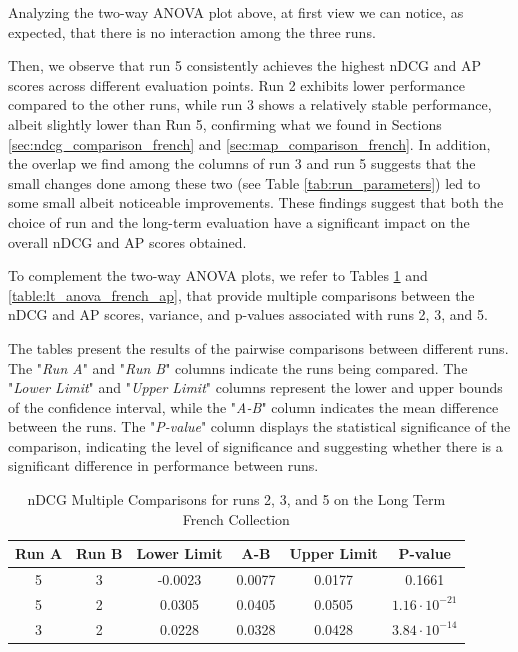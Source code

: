 Analyzing the two-way \ac{ANOVA} plot above, at first view we can notice, as expected, that there is no interaction among the three runs.  

Then, we observe that run 5 consistently achieves the highest \ac{nDCG}  and \ac{AP} scores across different evaluation points. 
Run 2 exhibits lower performance compared to the other runs, while run 3 shows a relatively stable performance, albeit slightly lower than Run 5, confirming what we found in Sections \ref{sec:ndcg_comparison_french} and \ref{sec:map_comparison_french}.
In addition, the overlap we find among the columns of run 3 and run 5 suggests that the small changes done among these two (see Table \ref{tab:run_parameters}) led to some small albeit noticeable improvements. 
These findings suggest that both the choice of run and the long-term evaluation have a significant impact on the overall \ac{nDCG} and \ac{AP} scores obtained.

To complement the two-way \ac{ANOVA} plots, we refer to Tables \ref{table:lt_anova_french} and \ref{table:lt_anova_french_ap}, that provide multiple comparisons between the \ac{nDCG} and \ac{AP} scores, variance, and p-values associated with runs 2, 3, and 5. 

The tables present the results of the pairwise comparisons between different runs. 
The "\textit{Run A}" and "\textit{Run B}" columns indicate the runs being compared.
The "\textit{Lower Limit}" and "\textit{Upper Limit}" columns represent the lower and upper bounds of the confidence interval, while the "\textit{A-B}" column indicates the mean difference between the runs.
The "\textit{P-value}" column displays the statistical significance of the comparison, indicating the level of significance and suggesting whether there is a significant difference in performance between runs.


\begin{table}[!h]
    \centering
    \caption{\ac{nDCG} Multiple Comparisons for runs 2, 3, and 5 on the Long Term French Collection}
    \label{table:lt_anova_french}
    \begin{tabular}{cccccc}
    \hline
    Run A & Run B & Lower Limit & A-B & Upper Limit & P-value \\ \hline
    5 & 3 & -0.0023 & 0.0077 & 0.0177 & 0.1661 \\
    5 & 2 & 0.0305 & 0.0405 & 0.0505 & $1.16 \cdot 10^{-21}$ \\
    3 & 2 & 0.0228 & 0.0328 & 0.0428 & $3.84 \cdot 10^{-14}$ \\ \hline
    \end{tabular}
\end{table}

